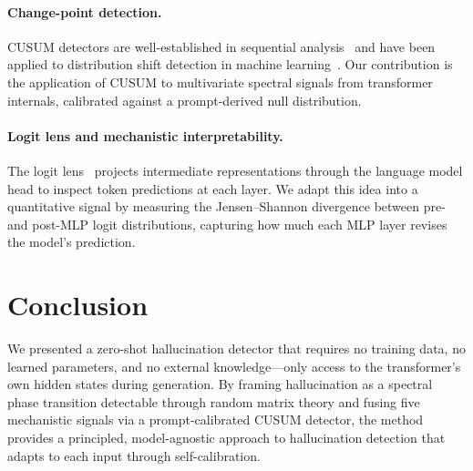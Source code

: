 \documentclass{article}
\begin{document}
\paragraph{Change-point detection.}
CUSUM detectors are well-established in sequential analysis~\citep{page1954continuous} and have been applied to distribution shift detection in machine learning~\citep{rabanser2019failing}. Our contribution is the application of CUSUM to multivariate spectral signals from transformer internals, calibrated against a prompt-derived null distribution.

\paragraph{Logit lens and mechanistic interpretability.}
The logit lens~\citep{nostalgebraist2020logitlens} projects intermediate representations through the language model head to inspect token predictions at each layer. We adapt this idea into a quantitative signal by measuring the Jensen--Shannon divergence between pre- and post-MLP logit distributions, capturing how much each MLP layer revises the model's prediction.


\section{Conclusion}
\label{sec:conclusion}

We presented a zero-shot hallucination detector that requires no training data, no learned parameters, and no external knowledge---only access to the transformer's own hidden states during generation. By framing hallucination as a spectral phase transition detectable through random matrix theory and fusing five mechanistic signals via a prompt-calibrated CUSUM detector, the method provides a principled, model-agnostic approach to hallucination detection that adapts to each input through self-calibration.




\end{document}
